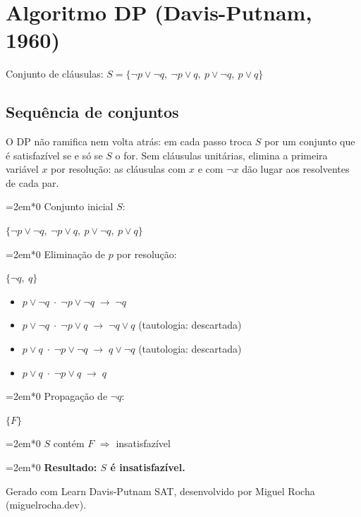 \documentclass[a4paper,11pt]{article}
\newcommand{\passo}[4]{%
  \par{\leftskip=\dimexpr 2em*#1\relax
  \noindent\makebox[2.5em][l]{#2}#3\par
  \if\relax\detokenize{#4}\relax\else\noindent\hspace*{2.5em}#4\par\fi}%
  \smallskip}
\newenvironment{pares}{\begin{itemize}\setlength{\itemsep}{0pt}\small}{\end{itemize}\smallskip}
\begin{document}
\section*{Algoritmo DP (Davis-Putnam, 1960)}

Conjunto de cláusulas: $S = \{\neg p \lor \neg q,\allowbreak\ \neg p \lor q,\allowbreak\ p \lor \neg q,\allowbreak\ p \lor q\}$

\subsection*{Sequência de conjuntos}

O DP não ramifica nem volta atrás: em cada passo troca $S$ por um conjunto que é satisfazível se e só se $S$ o for. Sem cláusulas unitárias, elimina a primeira variável $x$ por resolução: as cláusulas com $x$ e com $\neg x$ dão lugar aos resolventes de cada par.

\passo{0}{(1)}{Conjunto inicial $S$:}{$\{\neg p \lor \neg q,\allowbreak\ \neg p \lor q,\allowbreak\ p \lor \neg q,\allowbreak\ p \lor q\}$}
\passo{0}{(2)}{Eliminação de $p$ por resolução:}{$\{\neg q,\allowbreak\ q\}$}
\noindent\hspace*{2.5em}{\small Pares resolvidos (cláusula com $p$ $\cdot$ cláusula com $\neg p$ $\to$ resolvente):}
\begin{pares}
\item $p \lor \neg q \;\cdot\; \neg p \lor \neg q \;\to\; \neg q$
\item $p \lor \neg q \;\cdot\; \neg p \lor q \;\to\; \neg q \lor q$ (tautologia: descartada)
\item $p \lor q \;\cdot\; \neg p \lor \neg q \;\to\; q \lor \neg q$ (tautologia: descartada)
\item $p \lor q \;\cdot\; \neg p \lor q \;\to\; q$
\end{pares}
\passo{0}{(3)}{Propagação de $\neg q$:}{$\{F\}$}
\passo{0}{}{$S$ contém $F$ $\Rightarrow$ insatisfazível}{}
\passo{0}{}{\textbf{Resultado: $S$ é insatisfazível.}}{}

\vfill
{\footnotesize Gerado com Learn Davis-Putnam SAT, desenvolvido por Miguel Rocha (miguelrocha.dev).}
\end{document}
